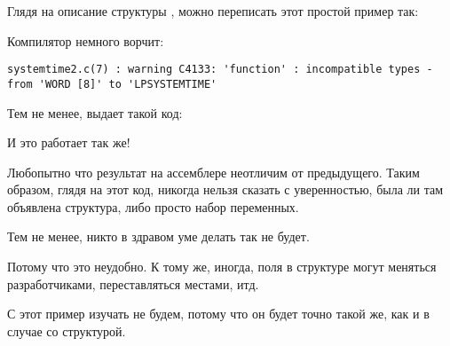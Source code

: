 Глядя на описание структуры , можно переписать этот простой пример так:%



Компилятор немного ворчит:

\begin{lstlisting}
systemtime2.c(7) : warning C4133: 'function' : incompatible types - from 'WORD [8]' to 'LPSYSTEMTIME'
\end{lstlisting}

Тем не менее, выдает такой код:



И это работает так же!

Любопытно что результат на ассемблере неотличим от предыдущего.
Таким образом, глядя на этот код, 
никогда нельзя сказать с уверенностью, была ли там объявлена структура, либо просто набор переменных.

Тем не менее, никто в здравом уме делать так не будет.

Потому что это неудобно. 
К тому же, иногда, поля в структуре могут меняться разработчиками, переставляться местами, итд.

С \olly этот пример изучать не будем, потому что он будет точно такой же, как и в случае со структурой.

